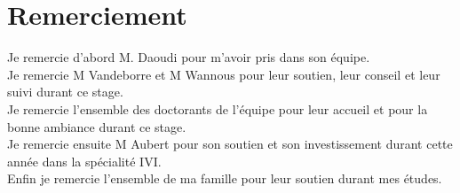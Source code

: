 \documentclass[a4paper,11pt]{article}
\begin{document}
\newpage




\section*{Remerciement}
Je remercie d'abord M. Daoudi pour m'avoir pris dans son équipe.\\

Je remercie M Vandeborre et M Wannous pour leur soutien, leur conseil et leur suivi durant ce stage.\\

Je remercie l'ensemble des doctorants de l'équipe pour leur accueil et pour la bonne ambiance durant ce stage.\\ 

Je remercie ensuite M Aubert pour son soutien et son investissement durant cette année dans la spécialité IVI.\\

Enfin je remercie l'ensemble de ma famille pour leur soutien durant mes études.
\newpage
\end{document}
